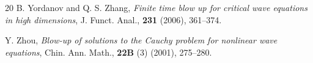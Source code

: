 \documentclass[12pt,leqno]{amsart}
\numberwithin{equation}{section}
\theoremstyle{remark}
\begin{document}
\begin{thebibliography}{20}
{B. Yordanov and Q. S. Zhang}, {\it Finite time blow up for critical wave equations in high dimensions}, J. Funct. Anal., {\bf 231} (2006), 361--374.



{Y. Zhou}, {\it Blow-up of solutions to the Cauchy problem for nonlinear wave equations}, Chin. Ann. Math., {\bf 22B}  (3) (2001), 275--280.





\end{thebibliography}
\end{document}

